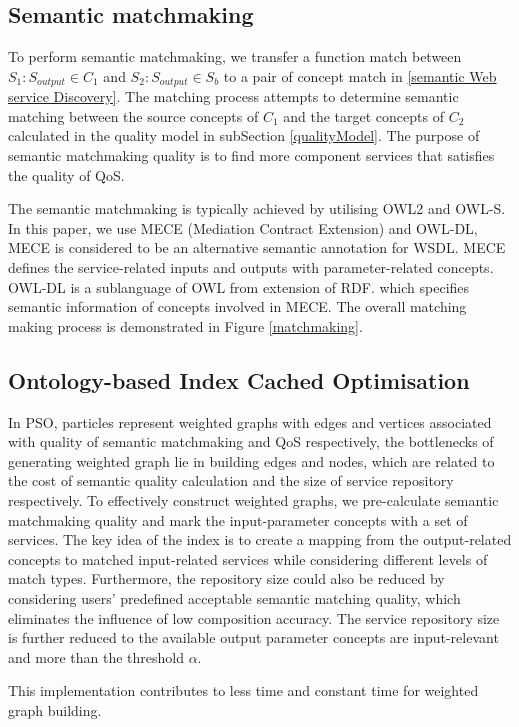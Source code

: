 \documentclass{llncs}
\begin{document}
\subsection{Semantic matchmaking} \label{semantic_matchmaking}
To perform semantic matchmaking, we transfer a function match between $S_{1}: S_{output} \in C_{1}$ and $S_{2}:S_{output} \in S_{b}$ to a pair of concept match in \ref{semantic Web service Discovery}. The matching process attempts to determine semantic matching between the source concepts of $C_{1}$ and the target concepts of $C_{2}$ calculated in the quality model in subSection \ref{qualityModel}. The purpose of semantic matchmaking quality is to find more component services that satisfies the quality of QoS.

The semantic matchmaking is typically achieved by utilising OWL2 and OWL-S. In this paper, we use MECE (Mediation Contract Extension) \cite{bleul2008self} and OWL-DL, MECE is considered to be an alternative semantic annotation for WSDL. MECE defines the service-related inputs and outputs with parameter-related concepts. OWL-DL is a sublanguage of OWL from extension of RDF. which specifies semantic information of concepts involved in MECE. The overall matching making process is demonstrated in Figure \ref{matchmaking}. 


\subsection{Ontology-based Index Cached Optimisation}
In PSO, particles represent weighted graphs with edges and vertices associated with quality of semantic matchmaking and QoS respectively, the bottlenecks of generating weighted graph lie in building edges and nodes, which are related to the cost of semantic quality calculation and the size of service repository respectively. To effectively construct weighted graphs, we pre-calculate semantic matchmaking quality and mark the input-parameter concepts with a set of services. The key idea of the index is to create a mapping from the output-related concepts to matched input-related services while considering different levels of match types. Furthermore, the repository size could also be reduced by considering users' predefined acceptable semantic matching quality, which eliminates the influence of low composition accuracy.  The service repository size is further reduced to the available output parameter concepts are input-relevant and more than the threshold $\alpha$.


This implementation contributes to less time and constant time for weighted graph building.
\end{document}
